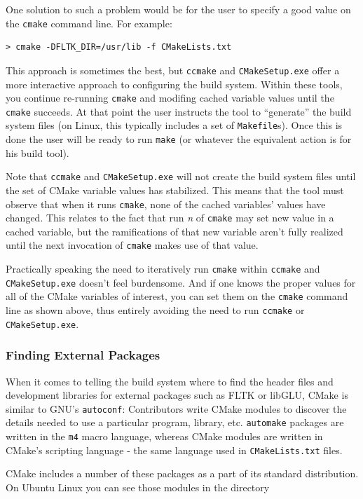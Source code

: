 \documentclass[letterpaper,10pt]{article}
\begin{document}
One solution to such a problem would be for the user to specify a good value on the
\verb|cmake| command line.  For example:
\begin{verbatim}
> cmake -DFLTK_DIR=/usr/lib -f CMakeLists.txt
\end{verbatim} 

This approach is sometimes the best, but \verb|ccmake| and \verb|CMakeSetup.exe| offer a
more interactive approach to configuring the build system.  Within these tools, you continue
re-running \verb|cmake| and modifing cached variable values until the \verb|cmake| succeeds.
At that point the user instructs the tool to ``generate'' the build system files (on Linux,
this typically includes a set of \verb|Makefile|s).  Once this is done the user will 
be ready to run \verb|make| (or whatever the equivalent action is for his build tool).

Note that \verb|ccmake| and \verb|CMakeSetup.exe| will not create the build system files
until the set of CMake variable values has stabilized.  This means that the tool must observe
that when it runs \verb|cmake|, none of the cached variables' values have changed.  This
relates to the fact that run \textit{n} of \verb|cmake| may set new value in a cached variable,
but the ramifications of that new variable aren't fully realized until the next invocation of
\verb|cmake| makes use of that value.

Practically speaking the need to iteratively run \verb|cmake| within \verb|ccmake| and \verb|CMakeSetup.exe| doesn't feel burdensome.  And if one knows the proper values for all
of the CMake variables of interest, you can set them on the \verb|cmake| command line 
as shown above, thus entirely avoiding the need to run \verb|ccmake| or
\verb|CMakeSetup.exe|.

\subsubsection{Finding External Packages}
When it comes to telling the build system where to find the header files and
development libraries for external packages such as FLTK or libGLU, CMake is
similar to GNU's \verb|autoconf|:  Contributors write CMake modules to discover 
the details needed to use a particular program, library, etc.  \verb|automake|
packages are written in the \verb|m4| macro language, whereas CMake modules are
written in CMake's scripting language - the same language used in 
\verb|CMakeLists.txt| files.  

CMake includes a number of these packages as a 
part of its standard distribution.  On Ubuntu Linux you can see those modules
in the directory 
\end{document}
